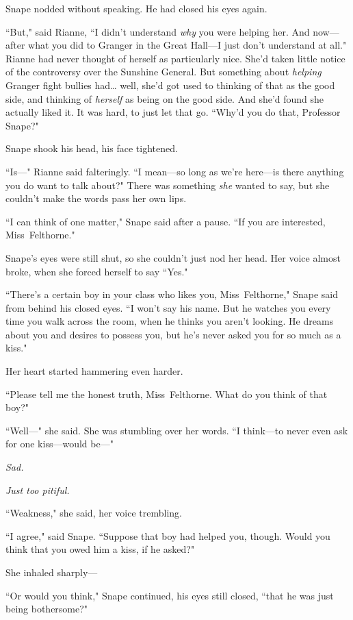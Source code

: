 Snape nodded without speaking. He had closed his eyes again.

``But," said Rianne, ``I didn't understand \emph{why} you were helping her. And now---after what you did to Granger in the Great Hall---I just don't understand at all." Rianne had never thought of herself as particularly nice. She'd taken little notice of the controversy over the Sunshine General. But something about \emph{helping} Granger fight bullies had{\ldots} well, she'd got used to thinking of that as the good side, and thinking of \emph{herself} as being on the good side. And she'd found she actually liked it. It was hard, to just let that go. ``Why'd you do that, Professor Snape?"

Snape shook his head, his face tightened.

``Is---" Rianne said falteringly. ``I mean---so long as we're here---is there anything you do want to talk about?" There was something \emph{she} wanted to say, but she couldn't make the words pass her own lips.

``I can think of one matter," Snape said after a pause. ``If you are interested, Miss~Felthorne."

Snape's eyes were still shut, so she couldn't just nod her head. Her voice almost broke, when she forced herself to say ``Yes."

``There's a certain boy in your class who likes you, Miss~Felthorne," Snape said from behind his closed eyes. ``I won't say his name. But he watches you every time you walk across the room, when he thinks you aren't looking. He dreams about you and desires to possess you, but he's never asked you for so much as a kiss."

Her heart started hammering even harder.

``Please tell me the honest truth, Miss~Felthorne. What do you think of that boy?"

``Well---" she said. She was stumbling over her words. ``I think---to never even ask for one kiss---would be---"

\emph{Sad.}

\emph{Just too pitiful.}

``Weakness," she said, her voice trembling.

``I agree," said Snape. ``Suppose that boy had helped you, though. Would you think that you owed him a kiss, if he asked?"

She inhaled sharply---

``Or would you think," Snape continued, his eyes still closed, ``that he was just being bothersome?"


